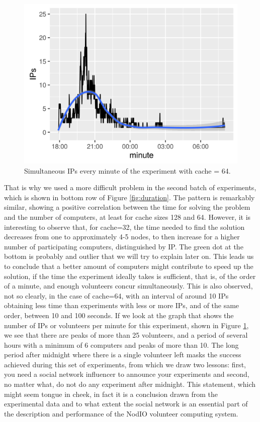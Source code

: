 \documentclass[letterpaper]{article}
\begin{document}
\begin{figure}[!htb]
\centering
\includegraphics[width=0.95\linewidth]{ips-per-minute-cache=64.png}
\caption{Simultaneous IPs every minute of the experiment with cache =
  64. \label{fig:otisdriftwood}}
\end{figure}


That is why we used a more difficult problem in the second batch of
experiments, which is shown in bottom row of Figure
\ref{fig:duration}. The pattern is remarkably similar, showing a
positive correlation between the time for solving the problem and the
number of computers, at least for cache sizes 128 and 64. However, it
is interesting to observe that, for cache=32, the time needed to find
the solution decreases from one to approximately 4-5 nodes, to then
increase for a higher number of participating computers, distinguished
by IP. The green dot at the bottom is probably and outlier that we
will try to explain later on. This leads us to conclude that a better
amount of computers might contribute to speed up the solution, if the
time the experiment ideally takes is sufficient, that is, of the order of a
minute, and enough volunteers concur simultaneously. This is also
observed, not so clearly, in the case of cache=64, with an interval of
around 10 IPs obtaining less time than experiments with less or more
IPs, and of the same order, between 10 and 100 seconds. If we look at
the graph that shows the number of IPs or volunteers per minute for
this experiment, shown in Figure \ref{fig:otisdriftwood}, we see that
there are peaks of more than 25 volunteers, and a period of several
hours with a minimum of 6 computers and peaks of more than 10. The
long period after midnight where there is a single volunteer left
masks the success achieved during this set of experiments, from which
we draw two lessons: first, you need a social network influencer to
announce your experiments and second, no matter what, do not do any
experiment after midnight. This statement, which might seem tongue in
cheek, in fact it is a conclusion drawn from the experimental data and
to what extent the social network is an essential part of the
description and performance of the NodIO volunteer computing system. 
\end{document}
